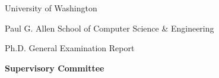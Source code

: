 \documentclass[12pt,letterpaper]{article}
\begin{document}
\hypersetup{pageanchor=false}
\begin{titlepage}
  \centering
  {\large University of Washington\par}
  {\large Paul G. Allen School of Computer Science \& Engineering\par}
  \vfill
  {\Huge\bfseries \reporttitle\par}
  \vspace{1.5em}
  {\Large \reportauthor\par}
  \vspace{1.5em}
  {\large Ph.D. General Examination Report\par}
  \vfill
  {\large \reportdate\par}
  \reporttime\enspace\textperiodcentered\enspace\reportlocation\par
  \vspace{2em}
  \textbf{Supervisory Committee}\par
  \vspace{0.75em}
  \reportcommittee
  \vfill
\end{titlepage}

\hypersetup{pageanchor=true}
\begin{abstract}
  
\end{abstract}
\setcounter{tocdepth}{1}
\tableofcontents
\clearpage










\clearpage
{}
{}


\end{document}
